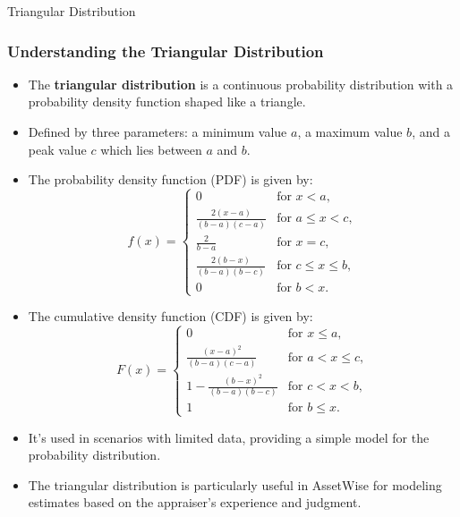 \documentclass{beamer}
\begin{document}
\begin{frame}[allowframebreaks]{Triangular Distribution}
	\frametitle{Understanding the Triangular Distribution}
	
	\begin{itemize}
		\item The \textbf{triangular distribution} is a continuous probability distribution with a probability density function shaped like a triangle.
		\item Defined by three parameters: a minimum value \( a \), a maximum value \( b \), and a peak value \( c \) which lies between \( a \) and \( b \).
		\item The probability density function (PDF) is given by:
		\[
		f(x) = \begin{cases}
			0 & \text{for } x < a, \\ 
			\frac{2(x-a)}{(b-a)(c-a)} & \text{for } a \leq x < c, \\
			\frac{2}{b-a} & \text{for } x = c,\\
			\frac{2(b-x)}{(b-a)(b-c)} & \text{for } c \leq x \leq b, \\
			0 & \text{for } b < x.
		\end{cases}
		\]
		\item The cumulative density function (CDF) is given by:
		\[
		F(x) = \begin{cases} 
			0 & \text{for } x \leq a, \\
			\frac{(x-a)^2}{(b-a)(c-a)} & \text{for } a < x \leq c, \\
			1 - \frac{(b-x)^2}{(b-a)(b-c)} & \text{for } c < x < b, \\
			1 & \text{for } b \leq x.
		\end{cases}
		\]
		\item It's used in scenarios with limited data, providing a simple model for the probability distribution.
		\item The triangular distribution is particularly useful in AssetWise for modeling estimates based on the appraiser's experience and judgment.
	\end{itemize}
\end{frame}
\end{document}
